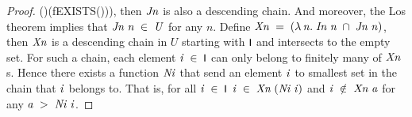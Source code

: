 \documentclass[letterpaper]{article}
\renewcommand{\HOLConst}[1]{{\textsf{\upshape\small #1}}}
\renewcommand{\HOLinline}[1]{\ensuremath{#1}}
\begin{document}
\begin{proof}
{\;\;\;\;\;\;\;\;\;\;\;\;\;\;\HOLConst{feval}\;(\;)\;\HOLBoundVar{\ensuremath{\sigma}}\;(\HOLConst{fEXISTS}\;\;(\;))\HOLTokenRightbrace{})}, then \HOLinline{\HOLFreeVar{Jn}} is also a descending chain. And moreover, the Los theorem implies that \HOLinline{\HOLFreeVar{Jn}\;\HOLFreeVar{n}\;\HOLSymConst{\HOLTokenIn{}}\;\HOLFreeVar{U}} for any $n$. Define \HOLinline{\HOLFreeVar{Xn}\;\HOLSymConst{=}\;(\HOLTokenLambda{}\HOLBoundVar{n}.\;\HOLFreeVar{In}\;\HOLBoundVar{n}\;\HOLSymConst{\HOLTokenInter{}}\;\HOLFreeVar{Jn}\;\HOLBoundVar{n})}, then \HOLinline{\HOLFreeVar{Xn}} is a descending chain in $U$ starting with \HOLinline{\HOLConst{I}} and intersects to the empty set. For such a chain, each element \HOLinline{\HOLFreeVar{i}\;\HOLSymConst{\HOLTokenIn{}}\;\HOLConst{I}} can only belong to finitely many of \HOLinline{\HOLFreeVar{Xn}}s. Hence there exists a function \HOLinline{\HOLFreeVar{Ni}} that send an element \HOLinline{\HOLFreeVar{i}} to smallest set in the chain that \HOLinline{\HOLFreeVar{i}} belongs to. That is, for all \HOLinline{\HOLFreeVar{i}\;\HOLSymConst{\HOLTokenIn{}}\;\HOLConst{I}} \HOLinline{\HOLFreeVar{i}\;\HOLSymConst{\HOLTokenIn{}}\;\HOLFreeVar{Xn}\;(\HOLFreeVar{Ni}\;\HOLFreeVar{i})} and \HOLinline{\HOLFreeVar{i}\;\HOLSymConst{\HOLTokenNotIn{}}\;\HOLFreeVar{Xn}\;\HOLFreeVar{a}} for any \HOLinline{\HOLFreeVar{a}\;\HOLSymConst{\HOLTokenGt{}}\;\HOLFreeVar{Ni}\;\HOLFreeVar{i}}.


\end{proof}
\end{document}
